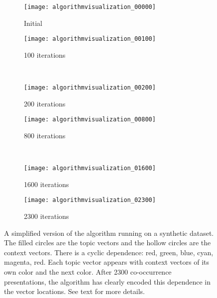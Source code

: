 \begin{figure}[tbp]
  \begin{subfigure}[b]{0.49\linewidth}
    \texttt{[image: algorithmvisualization\_00000]}
    \caption{Initial}
    \label{fig:algorithmvisualization:0000}
  \end{subfigure}
  \begin{subfigure}[b]{0.49\linewidth}
    \texttt{[image: algorithmvisualization\_00100]}
    \caption{100 iterations}
    \label{fig:algorithmvisualization:0100}
  \end{subfigure}
  \\
  \begin{subfigure}[b]{0.49\linewidth}
    \texttt{[image: algorithmvisualization\_00200]}
    \caption{200 iterations}
    \label{fig:algorithmvisualization:0200}
  \end{subfigure}
  \begin{subfigure}[b]{0.49\linewidth}
    \texttt{[image: algorithmvisualization\_00800]}
    \caption{800 iterations}
    \label{fig:algorithmvisualization:0800}
  \end{subfigure}
  \\
  \begin{subfigure}[b]{0.49\linewidth}
    \texttt{[image: algorithmvisualization\_01600]}
    \caption{1600 iterations}
    \label{fig:algorithmvisualization:1600}
  \end{subfigure}
  \begin{subfigure}[b]{0.49\linewidth}
    \texttt{[image: algorithmvisualization\_02300]}
    \caption{2300 iterations}
    \label{fig:algorithmvisualization:2300}
  \end{subfigure}
  
    \caption{A simplified version of the \modelname{} algorithm running on a
    synthetic dataset. The filled circles are the topic vectors and the hollow
    circles are the context vectors. There is a cyclic dependence: red, green,
    blue, cyan, magenta, red. Each topic vector appears with context vectors of 
    its own color and the next color. After 2300 co-occurrence presentations,
    the algorithm has clearly encoded this dependence in the vector locations. 
    See text for more details.}
   \label{fig:algorithmvisualization}
\end{figure}


